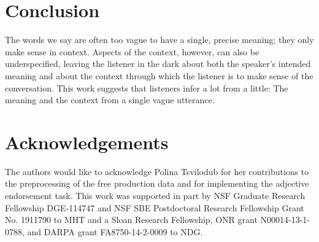 \documentclass[doc, floatsintext]{apa6}
\begin{document}
%
%
%


\section{Conclusion}

The words we say are often too vague to have a single, precise meaning; they only make sense in context.
Aspects of the context, however, can also be
underspecified, leaving the listener in the dark about both the
speaker's intended meaning and about the context through which the
listener is to make sense of the conversation. This work suggests that listeners infer a lot from a little:
The meaning and the context from a single vague utterance.


\section{Acknowledgements}

The authors would like to acknowledge Polina Tsvilodub for her contributions to the preprocessing of the free production data and for  implementing the adjective endorsement task.
This work was supported in part by NSF Graduate Research Fellowship
DGE-114747 and NSF SBE Postdoctoral Research Fellowship Grant No. 1911790 to  MHT and a Sloan Research Fellowship, ONR grant N00014-13-1-0788, and DARPA grant FA8750-14-2-0009 to NDG.
\end{document}
